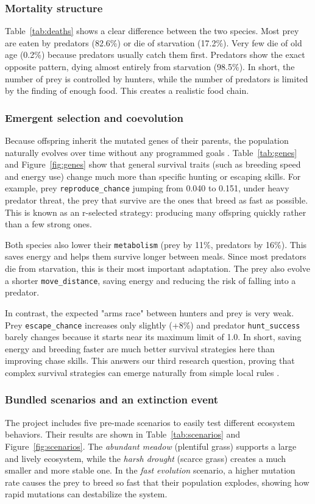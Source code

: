 \documentclass[english]{projectreport}
\begin{document}
\subsubsection{Mortality structure} 
Table~\ref{tab:deaths} shows a clear difference between the two species. Most prey are eaten by predators (82.6\%) or die of starvation (17.2\%). Very few die of old age (0.2\%) because predators usually catch them first. Predators show the exact opposite pattern, dying almost entirely from starvation (98.5\%). In short, the number of prey is controlled by hunters, while the number of predators is limited by the finding of enough food. This creates a realistic food chain.

\subsubsection{Emergent selection and coevolution} 
Because offspring inherit the mutated genes of their parents, the population naturally evolves over time without any programmed goals \cite{dijk2010, takashi2013}. Table~\ref{tab:genes} and Figure~\ref{fig:genes} show that general survival traits (such as breeding speed and energy use) change much more than specific hunting or escaping skills. For example, prey \texttt{reproduce\_chance} jumping from 0.040 to 0.151, under heavy predator threat, the prey that survive are the ones that breed as fast as possible. This is known as an r-selected strategy: producing many offspring quickly rather than a few strong ones.

Both species also lower their \texttt{metabolism} (prey by 11\%, predators by 16\%). This saves energy and helps them survive longer between meals. Since most predators die from starvation, this is their most important adaptation. The prey also evolve a shorter \texttt{move\_distance}, saving energy and reducing the risk of falling into a predator.

In contrast, the expected "arms race" between hunters and prey is very weak. Prey \texttt{escape\_chance} increases only slightly (+8\%) and predator \texttt{hunt\_success} barely changes because it starts near its maximum limit of 1.0. In short, saving energy and breeding faster are much better survival strategies here than improving chase skills. This answers our third research question, proving that complex survival strategies can emerge naturally from simple local rules \cite{li2023}.

\subsubsection{Bundled scenarios and an extinction event} 
The project includes five pre-made scenarios to easily test different ecosystem behaviors. Their results are shown in Table~\ref{tab:scenarios} and Figure~\ref{fig:scenarios}. The \emph{abundant meadow} (plentiful grass) supports a large and lively ecosystem, while the \emph{harsh drought} (scarce grass) creates a much smaller and more stable one. In the \emph{fast evolution} scenario, a higher mutation rate causes the prey to breed so fast that their population explodes, showing how rapid mutations can destabilize the system.
\end{document}
